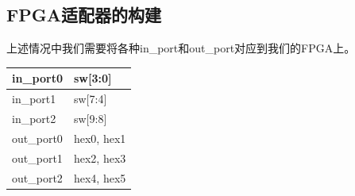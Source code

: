\documentclass[UTF8]{ctexart}
\begin{document}
\subsection{FPGA适配器的构建}
上述情况中我们需要将各种in\_port和out\_port对应到我们的FPGA上。
\newline
\begin{tabular}{|l|l|} %
	\hline
	in\_port0  & sw[3:0]    \\
	\hline
	in\_port1  & sw[7:4]    \\
	\hline
	in\_port2  & sw[9:8]    \\
	\hline
	out\_port0 & hex0, hex1 \\
	\hline
	out\_port1 & hex2, hex3 \\
	\hline
	out\_port2 & hex4, hex5 \\
	\hline
\end{tabular}
\end{document}
